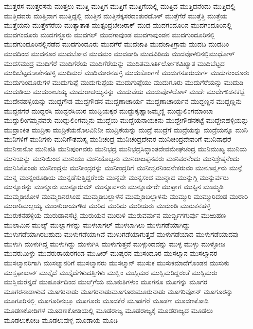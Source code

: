 {ಮುತ್ತರಸ
ಮುತ್ತರಸನು
ಮುತ್ತಲು
ಮುತ್ತಿ
ಮುತ್ತಿಗ
ಮುತ್ತಿಗೆ
ಮುತ್ತಿಗೆಯಲ್ಲಿ
ಮುತ್ತಿದ
ಮುತ್ತಿದನೆಂದು
ಮುತ್ತಿದಲ್ಲಿ
ಮುತ್ತಿದವರು
ಮುತ್ತಿದಾಗ
ಮುತ್ತಿದ್ದಲ್ಲಿ
ಮುತ್ತಿನ
ಮುತ್ತಿನೆಕ್ಕಸರದಂತುರದೊಳ್
ಮುತ್ತೆಗೆರೆ
ಮುತ್ತೆತ್ತಿ
ಮುತ್ತೆಯ
ಮುತ್ತೆಯನು
ಮುತ್ತೇಗೆರೆಯ
ಮುತ್ಯಾತಾತ
ಮುತ್ಸಂದ್ರಬೇಚಿರಾಕ್
ಮುದ
ಮುದಗಂದೂರಿನ
ಮುದಗಂದೂರಿನಲ್ಲಿ
ಮುದಗಂದೂರು
ಮುದಗನ್ದೂರು
ಮುದಗಲ್
ಮುದಗಾವುಂಡ
ಮುದಗಾವುಂಡನ
ಮುದಗುಂದೂರಿನಲ್ಲಿ
ಮುದಗುಂದೂರಿನಲ್ಲಿನಡೆದ
ಮುದಗುಂದೂರು
ಮುದಗೆರೆ
ಮುದಜಾತಿ
ಮುದಜಾತಿಗ್ರಾಮ
ಮುದದಿ
ಮುದದಿಂ
ಮುದದಿಂದ
ಮುದನೂರ
ಮುದಬೋವ
ಮುದಮಂ
ಮುದವಾಡಿ
ಮುದವಿಡಿಯ
ಮುದವೊಳಲಿನಲ್ಲಿಮುಧೋಳ್
ಮುದಸಮುದ್ರ
ಮುದಿಗೆರೆ
ಮುದಿಗೆರೆಯ
ಮುದಿಗೆರೆಯನ್ನು
ಮುದಿತಮೂರ್ತಿರ್ಲೋಕವಿಖ್ಯಾತ
ಮುದಿಬೆಟ್ಟದ
ಮುದಿಬೆಟ್ಟದಸಾತೇನಹಳ್ಳಿ
ಮುದಿಮಲೆ
ಮುದಿಮಾರನಹಳ್ಳಿ
ಮುದುಕೊಂಗಣಿ
ಮುದುಗನೂರುದುರ್ಗ
ಮುದುಗುಂದೂರು
ಮುದುಗುಂದೂರುಗಳ
ಮುದುಗುಪ್ಪೆ
ಮುದುಗುಪ್ಪೆಯ
ಮುದುಗುಪ್ಪೆಯು
ಮುದುಗೂರು
ಮುದುಗೆರೆಯನ್ನು
ಮುದುಡಿ
ಮುದುಡಿಯ
ಮುದುರಾಚಯ್ಯ
ಮುದುರಾಚಯ್ಯನನ್ನು
ಮುದುವೆಯ
ಮುದುವೊಳಲೊಳ್
ಮುದೇ
ಮುದೇಗೌಡನಕಟ್ಟೆ
ಮುದೇನಹಳ್ಳಿಯನ್ನು
ಮುದ್ದಗೌಡ
ಮುದ್ದಗೌಡನ
ಮುದ್ದಣಾಚಾರ್ಯ
ಮುದ್ದಣಾಚಾರ್ಯನ
ಮುದ್ದಣ್ಣನ
ಮುದ್ದಣ್ಣನು
ಮುದ್ದನಗೆರೆ
ಮುದ್ದರಸಿ
ಮುದ್ದರಸಿಯರ
ಮುದ್ದಿಯಕ್ಕರ
ಮುದ್ದುಕೃಷ್ಣಾಜಮ್ಮಣ್ಣಿ
ಮುದ್ದುಲಿಂಗಮಾಂಬಾ
ಮುದ್ದುಲಿಂಗಮ್ಮನವರು
ಮುದ್ದುಲಿಂಗಮ್ಮನು
ಮುದ್ದೆಯ
ಮುದ್ದೆಯನಾಯಕನು
ಮುದ್ದೇಗೌಡನಕಟ್ಟೆ
ಮುದ್ದೇನಹಳ್ಳಿಯನ್ನು
ಮುದ್ರಾಂಕಿತ
ಮುದ್ರಿಕಾ
ಮುದ್ರಿಕೆಯನೊಲವಿನಿನೀ
ಮುದ್ರಿಕೆಯನ್ನು
ಮುದ್ರೆ
ಮುದ್ರೆಗೆ
ಮುದ್ರೆಯನ್ನು
ಮುದ್ರೆಯನ್ನೂ
ಮುನಿ
ಮುನಿಗಳಿಗೆ
ಮುನಿಗಳು
ಮುನಿಗೌತಮಸ್ಯ
ಮುನಿಚಂದ್ರ
ಮುನಿಚಂದ್ರದೇವರ
ಮುನಿಚಂದ್ರದೇವರಿಗೆ
ಮುನಿನಾಥರೆ
ಮುನಿನಾನೋ
ಮುನಿಪತಿ
ಮುನಿಪುಂಗವರು
ಮುನಿಭದ್ರ
ಮುನಿಭದ್ರಸಿದ್ಧಾಂತದೇವಮೇಘಚಂದ್ರ
ಮುನಿಮುಖ್ಯ
ಮುನಿಯ
ಮುನಿಯನ್ನು
ಮುನಿಯಿಂದ
ಮುನಿಯು
ಮುನಿಯೊಬ್ಬನು
ಮುನಿರಾಜಪ್ಪನವರು
ಮುನಿವರನೆಂದು
ಮುನಿಶ್ರೇಷ್ಠನೆಂದು
ಮುನಿಸಿಕೊಂಡು
ಮುನೀಂದ್ರನು
ಮುನೀಂದ್ರರನ್ನು
ಮುನೀಂದ್ರರಿಗೆ
ಮುನೀಶ್ವರನಿಂದನೇಕರುವಂ
ಮುನೂರ್ವ್ವರು
ಮುನ್ದೆ
ಮುನ್ನ
ಮುನ್ನಂರೂಢಿಯ
ಮುನ್ನಡೆಸುತ್ತಿದ್ದರೆಂದು
ಮುನ್ನವೇ
ಮುನ್ನಸಂದ
ಮುನ್ನಾದ
ಮುನ್ನುಗ್ಗಿ
ಮುನ್ನುರ್ವರು
ಮುನ್ನೂರನ್ನು
ಮುನ್ನೂರು
ಮುನ್ನೂರುಮ್
ಮುನ್ನೂರ್ವರು
ಮುನ್ನೂರ್ವರೇ
ಮುಪ್ಪಾಗ
ಮುಪ್ಪಿನ
ಮುಮ್ಮಡಿ
ಮುಮ್ಮಡಿಚೋಳ
ಮುಮ್ಮಡಿನರಸಿಂಹ
ಮುಮ್ಮಡಿಬಲ್ಲಾಳನ
ಮುಮ್ಮಡಿಬಲ್ಲಾಳನು
ಮುಮ್ಮುರಿ
ಮುಮ್ಮುರಿದಂಡ
ಮುರಾರಿ
ಮುರಾರಿಮಲ್ಲಯ್ಯ
ಮುರಾರಿರಾಯಗೌಡ
ಮುರಿದ
ಮುರಿದು
ಮುರಿಯರು
ಮುರುಂಡಿ
ಮುರುಕನಹಳ್ಳಿ
ಮುರುಕನಹಳ್ಳಿಯ
ಮುರುಡಾನಸೆಟ್ಟಿ
ಮುರುಯನ
ಮುರುಳಿ
ಮುರುವರ್ಮನ
ಮುರ್ಬ್ಬಿಗಗುರ್ವು
ಮುಱುಹಣ
ಮುಲಾಮಿನ
ಮುಲ್ಕ್
ಮುಲ್ಲಾಗಳನ್ನು
ಮುಳಬಾಗಲ್
ಮುಳಬಾಗಿಲು
ಮುಳುಗಡೆಯಾಗಿದ್ದು
ಮುಳುಗಡೆಯಾಗಿರಬಹುದು
ಮುಳುಗಡೆಯಾಗಿವೆ
ಮುಳುಗಡೆಯಾಗುತ್ತವೆ
ಮುಳುಗಡೆಯಾದ
ಮುಳುಗಡೆಯಾದವು
ಮುಳುಗಿ
ಮುಳುಗಿದ್ದ
ಮುಳುಗಿದ್ದು
ಮುಳುಗಿಸಿ
ಮುಳುಗುತ್ತವೆ
ಮುಳ್ಗುಂದವನ್ನು
ಮುಳ್ಳ
ಮುಳ್ಳು
ಮುಳ್ಳೋಜ
ಮುವರುಮಿಳ್ದು
ಮುವರುರಾಯರಗಂಡ
ಮುಷೀರ್
ಮುಷ್ಕರನ
ಮುಸಂದೂರ
ಮುಸಲ್ಮಾನ
ಮುಸಲ್ಮಾನರ
ಮುಸಲ್ಮಾನರಿಗಾಗಿ
ಮುಸಲ್ಮಾನರಿಗೆ
ಮುಸಲ್ಮಾನರು
ಮುಸಲ್ಮಾನ್
ಮುಸುಕ
ಮುಸುಕಮಾದೆಗೊಂಡನ
ಮುಸುಕು
ಮುಸ್ತಫಾಖಾನ್
ಮುಸ್ತೈದೆ
ಮುಸ್ತೈದೆಗಳುದತ್ತಿಗಳು
ಮುಸ್ಲಿಂ
ಮುಸ್ಲಿಮರ
ಮುಸ್ಲಿಮರಿದ್ದರಂತೆ
ಮುಸ್ಲಿಮರು
ಮುಸ್ಲಿಮರೆನ್ನದೆ
ಮುಹೂರ್ತದಿಂದ
ಮುೞ್ತಿಗೆಯ
ಮೂಕುತಿಗಳುಂ
ಮೂಗನೂ
ಮೂಗನ್ನು
ಮೂಗರ
ಮೂಗರನಾಡಾಳುವ
ಮೂಗರನಾಡು
ಮೂಗರನಾಡುಮೂಗೂರುಮೂರುನಾಡು
ಮೂಗರಿವೋನ್
ಮೂಗೂರನ್ನು
ಮೂಗೂರಿನಲ್ಲಿ
ಮೂಗೂರಿನಲ್ಲೂ
ಮೂಗೂರು
ಮೂಡಕೆರೆ
ಮೂಡಗೆರೆ
ಮೂಡಣ
ಮೂಡಣಕೋಡಿ
ಮೂಡಣಕೋಡಿಗಳ
ಮೂಡಣಕೋಡಿಯಲ್ಲಿ
ಮೂಡರಾಜ್ಯ
ಮೂಡರಾಜ್ಯಕ್ಕೆ
ಮೂಡರಾಜ್ಯದ
ಮೂಡಲು
ಮೂಡಲುಕೋಡಿ
ಮೂಡಲುವುಳ್ಳ
ಮೂಡಾಯ
ಮೂಡಿ
}
